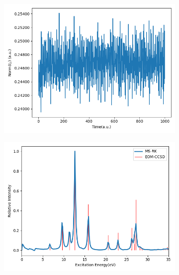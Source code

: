 \begin{figure}
    \centering
    \begin{subfigure}{0.475\textwidth}
        \centering
        \includegraphics[width=\textwidth]{ch3/Figs/4-5.png}
    \end{subfigure}
    \hfill
    \begin{subfigure}{0.475\textwidth}
        \centering
        \includegraphics[width=\textwidth]{ch3/Figs/4-3.png}
    \end{subfigure}
    \\
    \begin{subfigure}{0.475\textwidth}
        \centering

\end{subfigure}
\end{figure}
